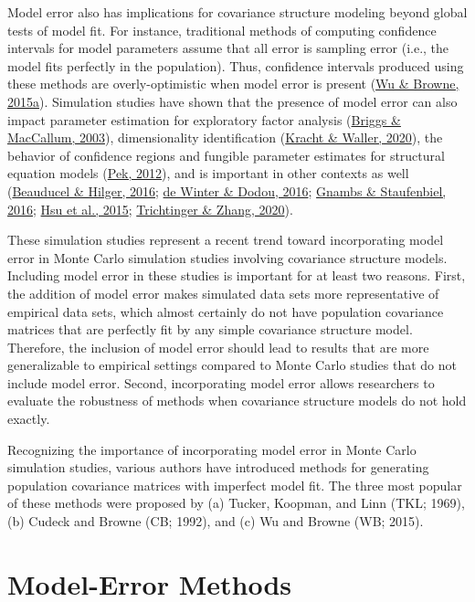 \documentclass[11pt]{umnthesis}
\begin{document}
Model error also has implications for covariance structure modeling beyond global tests of model fit. For instance, traditional methods of computing confidence intervals for model parameters assume that all error is sampling error (i.e., the model fits perfectly in the population). Thus, confidence intervals produced using these methods are overly-optimistic when model error is present (\protect\hyperlink{ref-wu2015}{Wu \& Browne, 2015a}). Simulation studies have shown that the presence of model error can also impact parameter estimation for exploratory factor analysis (\protect\hyperlink{ref-briggs2003}{Briggs \& MacCallum, 2003}), dimensionality identification (\protect\hyperlink{ref-kracht2020}{Kracht \& Waller, 2020}), the behavior of confidence regions and fungible parameter estimates for structural equation models (\protect\hyperlink{ref-pek2012}{Pek, 2012}), and is important in other contexts as well (\protect\hyperlink{ref-beauducel2016}{Beauducel \& Hilger, 2016}; \protect\hyperlink{ref-dewinter2016}{de Winter \& Dodou, 2016}; \protect\hyperlink{ref-gnambs2016}{Gnambs \& Staufenbiel, 2016}; \protect\hyperlink{ref-hsu2015}{Hsu et al., 2015}; \protect\hyperlink{ref-trichtinger2020}{Trichtinger \& Zhang, 2020}).

These simulation studies represent a recent trend toward incorporating model error in Monte Carlo simulation studies involving covariance structure models. Including model error in these studies is important for at least two reasons. First, the addition of model error makes simulated data sets more representative of empirical data sets, which almost certainly do not have population covariance matrices that are perfectly fit by any simple covariance structure model. Therefore, the inclusion of model error should lead to results that are more generalizable to empirical settings compared to Monte Carlo studies that do not include model error. Second, incorporating model error allows researchers to evaluate the robustness of methods when covariance structure models do not hold exactly.

Recognizing the importance of incorporating model error in Monte Carlo simulation studies, various authors have introduced methods for generating population covariance matrices with imperfect model fit. The three most popular of these methods were proposed by (a) Tucker, Koopman, and Linn (TKL; 1969), (b) Cudeck and Browne (CB; 1992), and (c) Wu and Browne (WB; 2015).

\hypertarget{model-error-methods}{%
\section{Model-Error Methods}\label{model-error-methods}}
\end{document}
